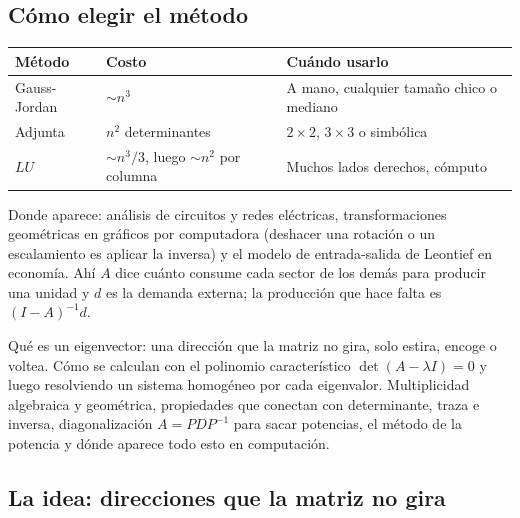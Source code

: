 \documentclass[11pt,letterpaper]{article}
\begin{document}
\subsection*{Cómo elegir el método}

\begin{center}
\begin{tabular}{lll}
    \toprule
    \textbf{Método} & \textbf{Costo} & \textbf{Cuándo usarlo} \\
    \midrule
    Gauss-Jordan & $\sim n^3$
        & A mano, cualquier tamaño chico o mediano \\
    Adjunta      & $n^2$ determinantes
        & $2 \times 2$, $3 \times 3$ o simbólica \\
    $LU$         & $\sim n^3/3$, luego $\sim n^2$ por columna
        & Muchos lados derechos, cómputo \\
    \bottomrule
\end{tabular}
\end{center}

Donde aparece: análisis de circuitos y redes eléctricas,
transformaciones geométricas en gráficos por computadora (deshacer una
rotación o un escalamiento es aplicar la inversa) y el modelo de
entrada-salida de Leontief en economía. Ahí $A$ dice cuánto consume
cada sector de los demás para producir una unidad y $d$ es la demanda
externa; la producción que hace falta es $(I - A)^{-1}d$.

\newpage



\begin{quick_sum}
    Qué es un eigenvector: una dirección que la matriz no gira, solo
    estira, encoge o voltea. Cómo se calculan con el polinomio
    característico $\det(A - \lambda I) = 0$ y luego resolviendo un
    sistema homogéneo por cada eigenvalor. Multiplicidad algebraica y
    geométrica, propiedades que conectan con determinante, traza e
    inversa, diagonalización $A = PDP^{-1}$ para sacar potencias, el
    método de la potencia y dónde aparece todo esto en computación.
\end{quick_sum}

\subsection*{La idea: direcciones que la matriz no gira}
\end{document}
